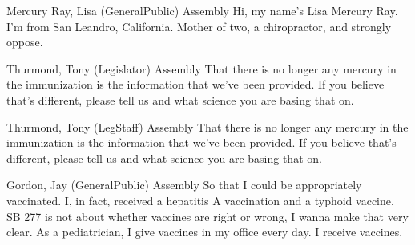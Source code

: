 \begin{result}{7.018925291222924}{Mercury Ray, Lisa (GeneralPublic) Assembly}
Hi, my name's Lisa Mercury Ray. I'm from San Leandro, California. Mother of two, a chiropractor, and strongly oppose.
\end{result}

\begin{result}{6.689088671002102}{Thurmond, Tony (Legislator) Assembly}
That there is no longer any mercury in the immunization is the information that we've been provided. If you believe that's different, please tell us and what science you are basing that on.
\end{result}

\begin{result}{6.689088671002102}{Thurmond, Tony (LegStaff) Assembly}
That there is no longer any mercury in the immunization is the information that we've been provided. If you believe that's different, please tell us and what science you are basing that on.
\end{result}

\begin{result}{3.093778771755809}{Gordon, Jay (GeneralPublic) Assembly}
So that I could be appropriately vaccinated. I, in fact, received a hepatitis A vaccination and a typhoid vaccine. SB 277 is not about whether vaccines are right or wrong, I wanna make that very clear. As a pediatrician, I give vaccines in my office every day. I receive vaccines.
\end{result}

